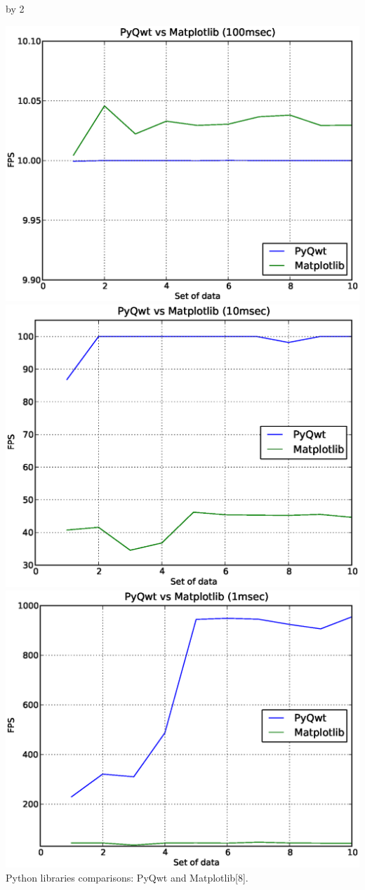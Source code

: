 \documentclass[11pt]{scrartcl}
\def\anzspalten{2}
\newlength{\kastenwidth}
\newenvironment{kasten}{
  \begin{lrbox}{\dummybox}
    \begin{minipage}{\linewidth}}
    {\end{minipage}
  \end{lrbox}
  \raisebox{-\depth}{\psshadowbox[cornersize=absolute,linearc=14pt,framesep=1em]{\usebox{\dummybox}}}\\[0.5em]}
\newenvironment{spalte}{
  \setlength\kastenwidth{1.2\textwidth}
  \divide\kastenwidth by \anzspalten
  \begin{minipage}[t]{\kastenwidth}}{\end{minipage}}
\begin{document}
\begin{lrbox}{\spalten}
{\begin{spalte}
\begin{kasten}
			\begin{minipage}[t]{0.95\linewidth}
				\begin{center}
				\includegraphics[width=0.30\linewidth, height=!]{../img/python-100}
				\includegraphics[width=0.30\linewidth, height=!]{../img/python-10}
				\includegraphics[width=0.30\linewidth, height=!]{../img/python-1}\\
				Python libraries comparisons: PyQwt and Matplotlib[8].
				\end{center}
			\end{minipage}


\end{kasten}
\end{spalte}}
\end{lrbox}
\end{document}
